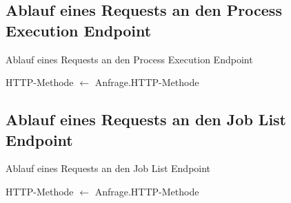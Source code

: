 \subsection{Ablauf eines Requests an den Process Execution Endpoint}
\begin{algorithm}[H]
\caption{Ablauf eines Requests an den Process Execution Endpoint}\label{PseudocodeProcessExecution}
\scriptsize
\begin{algorithmic}  
    \STATE HTTP-Methode $\gets$ Anfrage.HTTP-Methode       
\end{algorithmic}
\end{algorithm}

\subsection{Ablauf eines Requests an den Job List Endpoint}
\begin{algorithm}[H]
\scriptsize
\caption{Ablauf eines Requests an den Job List Endpoint}\label{PseudocodeJobList}
\begin{algorithmic}     
    \STATE HTTP-Methode $\gets$ Anfrage.HTTP-Methode
\end{algorithmic}
\end{algorithm}

